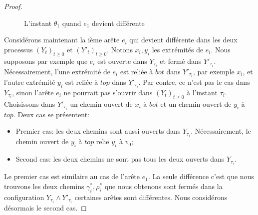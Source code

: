 \documentclass[titlepage,a4paper,12pt]{article}
\newcounter{cor}
\begin{document}
\begin{proof}
\begin{figure}[h]
\begin{minipage}{0.45\linewidth}
\end{minipage}
\begin{minipage}{0.45\linewidth}
\center
{}
\end{minipage}
\caption{L'instant $\theta_1$ quand $e_1$ devient différente}
\label{fig:e1}
\end{figure}

Considérons maintenant la ième arête $e_i$ qui devient différente dans les deux processus $(Y_t)_{t\geqslant 0}$ et $(Y'_t)_{t\geqslant 0}$. Notons $x_i,y_i$ les extrémités de $e_i$. Nous supposons par exemple que $e_i$ est ouverte dans $Y_{\tau_i}$ et fermé dans $Y'_{\tau_i}$. Nécessairement, l'une extrémité de $e_i$ est reliée à $bot$ dans $Y'_{\tau_i}$, par exemple $x_i$, et l'autre extrémité $y_i$ est reliée à $top$ dans $Y'_{\tau_i}$. Par contre, ce n'est pas le cas dans $Y_{\tau_i}$, sinon l'arête $e_i$ ne pourrait pas s'ouvrir dans $(Y_{t})_{t\geqslant 0}$ à l'instant $\tau_i$. Choisissons dans $Y'_{\tau_i}$ un chemin ouvert de $x_i$ à $bot$ et un chemin ouvert de $y_i$ à $top$.
Deux cas se présentent:
\begin{itemize}[label = $\bullet$, leftmargin =*]
\item Premier cas: les deux chemins sont aussi ouverts dans $Y_{\tau_i}$. Nécessairement, le chemin ouvert de $y_i$ à $top$ relie $y_i$ à $v_0$;
\item Second cas: les deux chemins ne sont pas tous les deux ouverts dans $Y_{\tau_i}$.
\end{itemize}

Le premier cas est similaire au cas de l'arête $e_1$. La seule différence c'est que nous trouvons les deux chemins $\gamma_i^*,\rho_i^*$ que nous obtenons sont fermés dans la configuration $Y_{\tau_i}\wedge Y'_{\tau_i}$ certaines arêtes sont différentes. Nous considérons désormais le second cas.


\end{proof}
\end{document}
